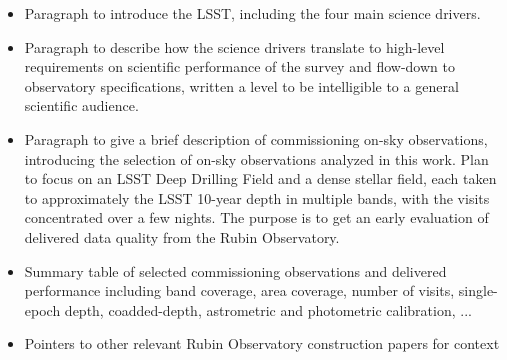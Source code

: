 



\begin{itemize}

\item Paragraph to introduce the LSST, including the four main science drivers.

\item Paragraph to describe how the science drivers translate to high-level requirements on scientific performance of the survey and flow-down to observatory specifications, written a level to be intelligible to a general scientific audience. 

\item Paragraph to give a brief description of commissioning on-sky observations, introducing the selection of on-sky observations analyzed in this work. 
Plan to focus on an LSST Deep Drilling Field and a dense stellar field, each taken to approximately the LSST 10-year depth in multiple bands, with the visits concentrated over a few nights. 
The purpose is to get an early evaluation of delivered data quality from the Rubin Observatory.

\item Summary table of selected commissioning observations and delivered performance including band coverage, area coverage, number of visits, single-epoch depth, coadded-depth, astrometric and photometric calibration, ...

\item Pointers to other relevant Rubin Observatory construction papers for context

\end{itemize}

